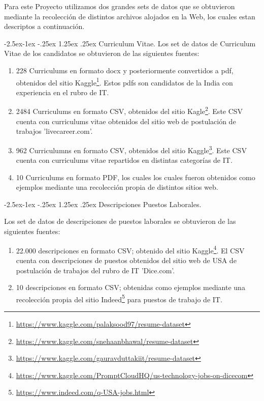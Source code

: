 \documentclass[12pt,a4paper]{article}
\makeatletter
\renewcommand\paragraph{\@startsection{paragraph}{4}{\z@}
            {-2.5ex\@plus -1ex \@minus -.25ex}
            {1.25ex \@plus .25ex}
            {\normalfont\normalsize\bfseries}}
\makeatother
\begin{document}
\begin{sloppypar}
Para este Proyecto utilizamos dos grandes sets de datos que se obtuvieron mediante la recolección de distintos archivos alojados en la Web, los cuales estan descriptos a continuación.

\paragraph{Curriculum Vitae.}
Los set de datos de Curriculum Vitae de los candidatos se obtuvieron de las siguientes fuentes:

\begin{enumerate}
\item 228 Curriculums en formato docx y posteriormente convertidos a pdf, obtenidos del sitio Kaggle\footnote{\url{https://www.kaggle.com/palaksood97/resume-dataset}}. Estos pdfs son candidatos de la India con experiencia en el rubro de IT.
\item 2484 Curriculums en formato CSV, obtenidos del sitio Kagle\footnote{\url{https://www.kaggle.com/snehaanbhawal/resume-dataset}}. Este CSV cuenta con curriculums vitae obtenidos del sitio web de postulación de trabajos 'livecareer.com'.
\item 962 Curriculumns en formato CSV, obtenidos del sitio Kaggle\footnote{\url{https://www.kaggle.com/gauravduttakiit/resume-dataset}}. Este CSV cuenta con curriculums vitae repartidos en distintas categorías de IT.
\item 10 Curriculums en formato PDF, los cuales los cuales fueron obtenidos como ejemplos mediante una recolección propia de distintos sitios web. 
\end{enumerate}

\paragraph{Descripciones Puestos Laborales.}

Los set de datos de descripciones de puestos laborales se obtuvieron de las siguientes fuentes:

\begin{enumerate}
\item 22.000 descripciones en formato CSV; obtenido del sitio Kaggle\footnote{\url{https://www.kaggle.com/PromptCloudHQ/us-technology-jobs-on-dicecom}}. El CSV cuenta con descripciones de puestos obtenidos del sitio web de USA de postulación de trabajos del rubro de IT 'Dice.com'.
\item 10 descripciones en formato CSV; obtenidas como ejemplos mediante una recolección propia del sitio Indeed\footnote{\url{https://www.indeed.com/q-USA-jobs.html}} para puestos de trabajo de IT.
\end{enumerate}


\end{sloppypar}
\end{document}
